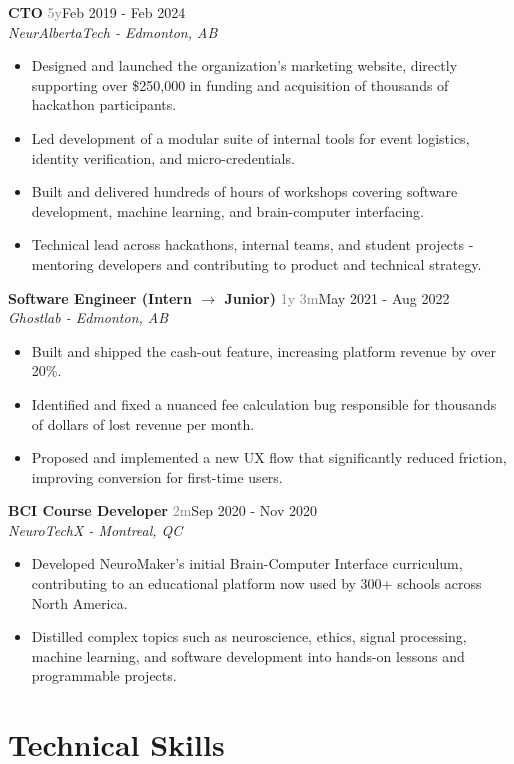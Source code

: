 \documentclass[10pt,letterpaper]{article}
\newcommand{\resumeHeading}[4]{\textbf{#1} \hfill \textcolor{gray}{\scriptsize #4}\hspace{0.35em}#3\\\textit{#2}}
\newcommand{\resumeFooting}[0]{\vspace{0.3em}}
\begin{document}
\resumeHeading
{CTO}
{NeurAlbertaTech - Edmonton, AB}
{Feb 2019 - Feb 2024}
{5y}

\begin{itemize}
\item Designed and launched the organization's marketing website, directly supporting over \$250,000 in funding and acquisition of thousands of hackathon participants.
\item Led development of a modular suite of internal tools for event logistics, identity verification, and micro-credentials.
\item Built and delivered hundreds of hours of workshops covering software development, machine learning, and brain-computer interfacing.
\item Technical lead across hackathons, internal teams, and student projects - mentoring developers and contributing to product and technical strategy.
\end{itemize}
\resumeFooting{}

\resumeHeading
{Software Engineer (Intern $\rightarrow$ Junior)}
{Ghostlab - Edmonton, AB}
{May 2021 - Aug 2022}
{1y 3m}

\begin{itemize}
\item Built and shipped the cash-out feature, increasing platform revenue by over 20\%.
\item Identified and fixed a nuanced fee calculation bug responsible for thousands of dollars of lost revenue per month.
\item Proposed and implemented a new UX flow that significantly reduced friction, improving conversion for first-time users.
\end{itemize}
\resumeFooting{}

\resumeHeading
{BCI Course Developer}
{NeuroTechX - Montreal, QC}
{Sep 2020 - Nov 2020}
{2m}

\begin{itemize}
\item Developed NeuroMaker's initial Brain-Computer Interface curriculum, contributing to an educational platform now used by 300+ schools across North America.
\item Distilled complex topics such as neuroscience, ethics, signal processing, machine learning, and software development into hands-on lessons and programmable projects.
\end{itemize}
\resumeFooting{}

\section{Technical Skills}
\end{document}
